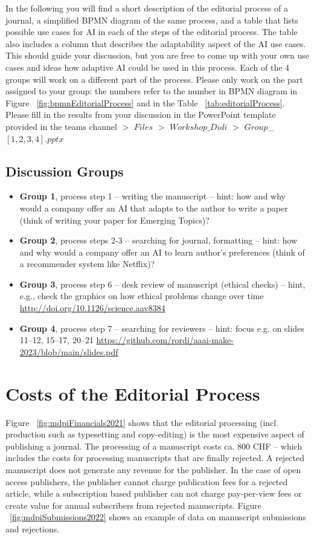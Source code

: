 \documentclass{article}
\begin{document}
In the following you will find a short description of the editorial process of a journal, a simplified BPMN diagram of the same 
process, and a table that lists possible use cases for AI in each of the steps of the editorial process. The table also includes
a column that describes the adaptability aspect of the AI use cases. This should guide your discussion, but you are free to
come up with your own use cases and ideas how adaptive AI could be used in this process. Each of the 4 groups will work on a
different part of the process. Please only work on the part assigned to your group: the numbers refer to the number in BPMN diagram
in Figure ~\ref{fig:bpmnEditorialProcess} and in the Table ~\ref{tab:editorialProcess}. Please fill in the results from your
discussion in the PowerPoint template provided in the teams channel $>$ $Files$ $>$ $Workshop\_Didi$ $>$ $Group$\_$[1,2,3,4].pptx$

\subsection*{Discussion Groups}

\begin{itemize}
    \item \textbf{Group 1}, process step 1 -- writing the manuscript -- hint: how and why would a company offer an AI that adapts to the author to write a paper (think of writing your paper for Emerging Topics)?
    \item \textbf{Group 2}, process steps 2-3 -- searching for journal, formatting -- hint: how and why would a company offer an AI to learn author's preferences (think of a recommender system like Netflix)?
    \item \textbf{Group 3}, process step 6 -- desk review of manuscript (ethical checks) -- hint, e.g., check the graphics on how ethical problems change over time \url{http://doi.org/10.1126/science.aav8384}
    \item \textbf{Group 4}, process step 7 -- searching for reviewers -- hint: focus e.g. on slides 11--12, 15--17, 20--21 \url{https://github.com/rordi/aaai-make-2023/blob/main/slides.pdf}
\end{itemize}


\section{Costs of the Editorial Process}

Figure ~\ref{fig:mdpiFinancials2021} shows that the editorial processing (incl. production such as typesetting and copy-editing) is the most
expensive aspect of publishing a journal. The processing of a manuscript costs ca. 800 CHF -- which includes the costs for processing manuscripts
that are finally rejected. A rejected manuscript does not generate any revenue for the publisher. In the case of open access publishers, the 
publisher cannot charge publication fees for a rejected article, while a subscription based publisher can not charge pay-per-view fees or 
create value for annual subscribers from rejected manuscripts. Figure ~\ref{fig:mdpiSubmissions2022} shows an example of data on manuscript
submissions and rejections.
\end{document}
